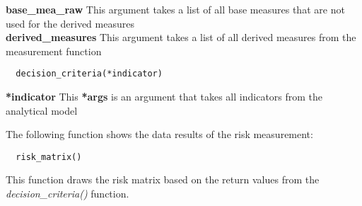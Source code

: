 \noindent\textbf{base\_mea\_raw}
This argument takes a list of all base measures that are not used for the derived measures \\

\noindent\textbf{derived\_measures}
This argument takes a list of all derived measures from the measurement function \\

\begin{lstlisting}
  decision_criteria(*indicator)
\end{lstlisting}

\noindent\textbf{*indicator}
This \textbf{*args} is an argument that takes all indicators from the analytical model

The following function shows the data results of the risk measurement: \\

\begin{lstlisting}
  risk_matrix()
\end{lstlisting}

This function draws the risk matrix based on the return values from the \textit{decision\_criteria()} function.

